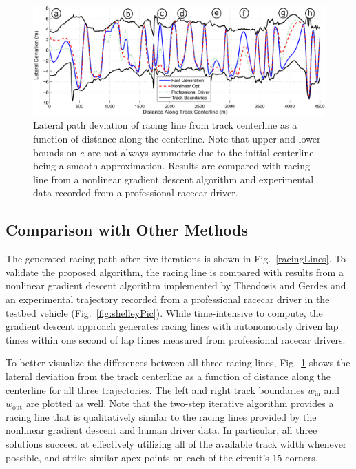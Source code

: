 \documentclass[twocolumn,10pt]{asme2ej}
\begin{document}
\begin{figure}
\centering
\includegraphics[width=6.5in]{figures/deviationFromCenterline.eps}
\caption{Lateral path deviation of racing line from track centerline as a function of distance along the centerline. Note that upper and lower bounds on $e$ are not always symmetric
due to the initial centerline being a smooth approximation. Results
are compared with racing line from a nonlinear gradient descent algorithm and experimental data recorded from a professional racecar driver.}
\label{fig:pathDeviation}
\end{figure}	

 
\subsection{Comparison with Other Methods}
The generated racing path after five iterations is shown in
Fig.~\ref{racingLines}. To validate the proposed algorithm, the racing line is compared with results from a nonlinear gradient descent algorithm implemented by 
Theodosis and Gerdes \cite{theodosis} and an experimental trajectory recorded from a professional racecar driver in the testbed vehicle (Fig.~\ref{fig:shelleyPic}).
 While time-intensive to compute, the gradient descent approach generates racing lines with autonomously driven lap times within one second of
lap times measured from professional racecar drivers. 

To better visualize the differences between all three racing lines, Fig.~\ref{fig:pathDeviation} shows the lateral deviation from the track centerline as a function of distance along the centerline 
for all three trajectories. The left and right track boundaries $w_\mathrm{in}$ and $w_\mathrm{out}$ are plotted as well. Note that the two-step iterative algorithm provides a 
racing line that is qualitatively similar to the racing lines provided by the nonlinear gradient descent and human driver data. In particular, all three
solutions succeed at effectively utilizing all of the available track width whenever possible, and strike similar apex points on each
of the circuit's 15 corners. 
\end{document}
